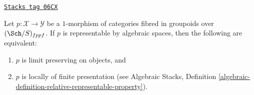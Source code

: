 \begin{lemma}
\label{criteria-lemma-representable-by-spaces-limit-preserving}
\href{https://stacks.math.columbia.edu/tag/06CX}{\texttt{Stacks tag 06CX}}

Let $p : \mathcal{X} \to \mathcal{Y}$ be a $1$-morphism of categories
fibred in groupoids over $(\Sch/S)_{fppf}$. If $p$ is
representable by algebraic spaces, then the following are equivalent:
\begin{enumerate}
\item $p$ is limit preserving on objects, and
\item $p$ is locally of finite presentation (see
Algebraic Stacks,
Definition \ref{algebraic-definition-relative-representable-property}).
\end{enumerate}
\end{lemma}

